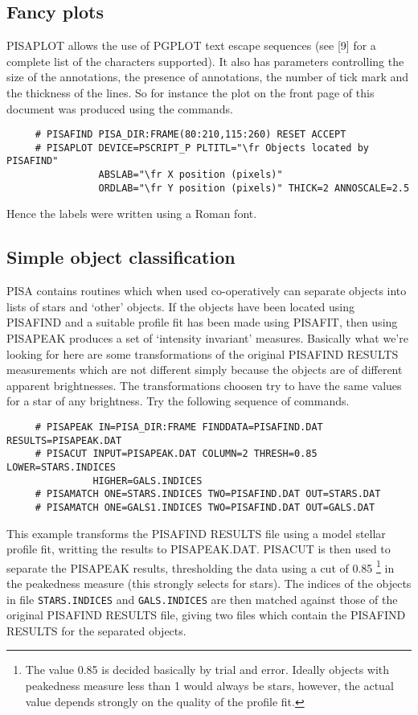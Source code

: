 \subsection{Fancy plots}

PISAPLOT allows the use of PGPLOT text escape sequences (see [9] for a
complete list of the characters supported). It also has parameters
controlling the size of the annotations, the presence of annotations,
the number of tick mark and the thickness of the lines. So for instance
the plot on the front page of this document was produced using the
commands.
\begin{verbatim}
     # PISAFIND PISA_DIR:FRAME(80:210,115:260) RESET ACCEPT
     # PISAPLOT DEVICE=PSCRIPT_P PLTITL="\fr Objects located by PISAFIND" 
                ABSLAB="\fr X position (pixels)" 
                ORDLAB="\fr Y position (pixels)" THICK=2 ANNOSCALE=2.5
\end{verbatim}

Hence the labels were written using a Roman font.

\subsection{Simple object classification}

PISA contains routines which when used co-operatively can separate objects
into lists of stars and `other' objects. If the objects have been located using
PISAFIND and a suitable profile fit has been made using PISAFIT, then using
PISAPEAK produces a set of `intensity invariant' measures. Basically what we're
looking for here are some transformations of the original PISAFIND RESULTS
measurements which are not different simply because the objects are of
different apparent brightnesses. The transformations choosen try to have the
same values for a star of any brightness. Try the following sequence of
commands.

\begin{verbatim}
     # PISAPEAK IN=PISA_DIR:FRAME FINDDATA=PISAFIND.DAT RESULTS=PISAPEAK.DAT
     # PISACUT INPUT=PISAPEAK.DAT COLUMN=2 THRESH=0.85 LOWER=STARS.INDICES
               HIGHER=GALS.INDICES 
     # PISAMATCH ONE=STARS.INDICES TWO=PISAFIND.DAT OUT=STARS.DAT 
     # PISAMATCH ONE=GALS1.INDICES TWO=PISAFIND.DAT OUT=GALS.DAT
\end{verbatim}

This example transforms the PISAFIND RESULTS file using a model stellar profile
fit, writting the results to PISAPEAK.DAT. PISACUT is then used to separate the
PISAPEAK results, thresholding the data using a cut of 0.85
\footnote{The value 0.85 is decided basically by trial and error. Ideally
objects with peakedness measure less than 1 would always be stars, however,
the actual value depends strongly on the quality of the profile fit.}
in the peakedness measure (this strongly selects for stars). The indices of the
objects in file \verb+STARS.INDICES+ and \verb+GALS.INDICES+ are then matched
against those of the original PISAFIND RESULTS file, giving two files which
contain the PISAFIND RESULTS for the separated objects. 

